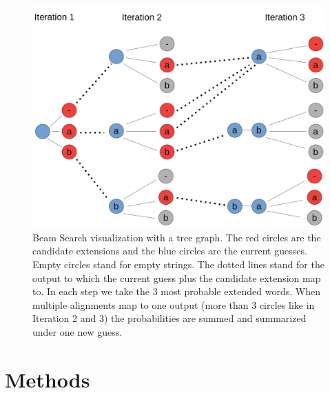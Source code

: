 \documentclass{article}
\begin{document}
\begin{figure}[H]
\begin{center}
\includegraphics[scale=0.2]{rsz_beam}
\end{center}
\caption{Beam Search visualization with a tree graph. The red circles are the candidate extensions and the blue circles are the current guesses. Empty circles stand for empty strings. The dotted lines stand for the output to which the current guess plus the candidate extension map to. In each step we take the 3 most probable extended words. When multiple alignments map to one output (more than 3 circles like in Iteration 2 and 3) the probabilities are summed and summarized under one new guess. }
\label{fig:beamsearch}
\end{figure}  

\newpage
\section{Methods}
\end{document}
